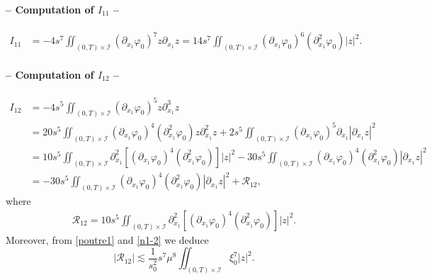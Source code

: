 \documentclass[a4paper, 12pt]{article}
\theoremstyle{plain}
\theoremstyle{definition}
\numberwithin{theorem}{section}
\numberwithin{equation}{section}
\begin{document}
{\paragraph{-- Computation of $I_{11}$ --}
\begin{align*}
  I_{11}&=-4s^7\iint_{(0,T)\times\mathcal{I}}(\partial_{x_1}\varphi_0)^7z\partial_{x_1}z
  =14s^7\iint_{(0,T)\times\mathcal{I}} (\partial_{x_1}\varphi_0)^6(\partial^2_{x_1}\varphi_0)|z|^2.
\end{align*}
\paragraph{-- Computation of $I_{12}$ --}
\begin{align*}
    I_{12}&=-4s^5 \iint_{(0,T)\times\mathcal{I}}(\partial_{x_1}\varphi_0)^5z\partial^3_{x_1}z\\
    &=20s^5\iint_{(0,T)\times\mathcal{I}}(\partial_{x_1}\varphi_0)^4(\partial_{x_1}^2\varphi_0)z\partial^2_{x_1}z+2s^5\iint_{(0,T)\times\mathcal{I}}(\partial_{x_1}\varphi_0)^5\partial_{x_1}|\partial_{x_1}z|^2\\
&=10s^5\iint_{(0,T)\times\mathcal{I}}\partial_{x_1}^2[(\partial_{x_1}\varphi_0)^4(\partial_{x_1}^2\varphi_0)]|z|^2-30s^5\iint_{(0,T)\times\mathcal{I}}(\partial_{x_1}\varphi_0)^4(\partial_{x_1}^2\varphi_0)|\partial_{x_1}z|^2\\
&=-30s^5\iint_{(0,T)\times\mathcal{I}}(\partial_{x_1}\varphi_0)^4(\partial_{x_1}^2\varphi_0)|\partial_{x_1}z|^2+\mathcal{R}_{12},
\end{align*}
where
\begin{align*}
\mathcal{R}_{12}=10s^5\iint_{(0,T)\times\mathcal{I}}\partial_{x_1}^2[(\partial_{x_1}\varphi_0)^4(\partial_{x_1}^2\varphi_0)]|z|^2.
\end{align*}
Moreover, from \eqref{poutre1} and \eqref{n1-2} we deduce
\begin{equation}\label{EstR12}
|\mathcal{R}_{12}|\lesssim \frac{1}{s_0^2} s^7 \mu^8\iint_{(0,T)\times\mathcal{I}}\xi_0^7 |z|^2.
\end{equation}
}
\end{document}
